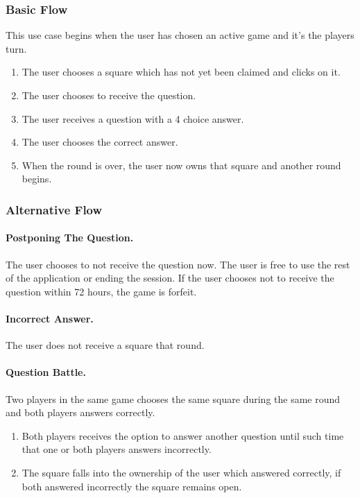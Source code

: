 \subsubsection{Basic Flow}
This use case begins when the user has chosen an active game and it's the players turn.
\begin{enumerate}
	\item The user chooses a square which has not yet been claimed and clicks on it.
	\item The user chooses to receive the question.
	\item The user receives a question with a 4 choice answer.
	\item The user chooses the correct answer.
	\item When the round is over, the user now owns that square and another round begins.
\end{enumerate}

\subsubsection{Alternative Flow}
\paragraph{Postponing The Question.}
The user chooses to not receive the question now.
The user is free to use the rest of the application or ending the session.
If the user chooses not to receive the question within 72 hours, the game is forfeit.

\paragraph{Incorrect Answer.}
The user does not receive a square that round.

\paragraph{Question Battle.}
Two players in the same game chooses the same square during the same round and both players answers correctly.
\begin{enumerate}
	\item Both players receives the option to answer another question until such time that one or both players answers incorrectly.
	\item The square falls into the ownership of the user which answered correctly, if both answered incorrectly the square remains open.
\end{enumerate}

